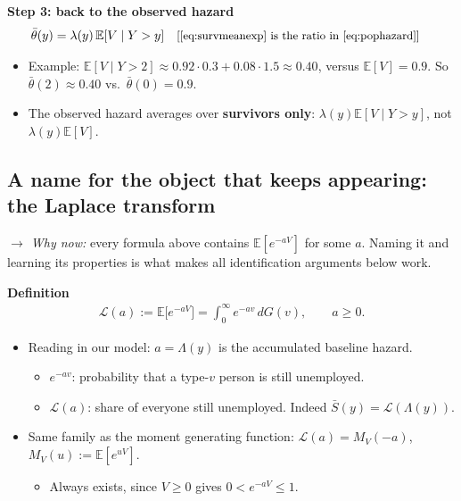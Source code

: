 \documentclass[11pt]{article}
\newcommand{\E}{\mathbb{E}}
\newcommand{\1}{\mathbf{1}}
\newcommand{\Lap}{\mathcal{L}}
\newcommand{\why}[1]{\text{\small[#1]}}
\newcommand{\whynow}[1]{\par\noindent\textit{$\rightarrow$ Why now:} #1\par}
\begin{document}
\textbf{Step 3: back to the observed hazard}
\begin{align}
  \bar\theta(y) &= \lambda(y)\,\E[V\mid Y>y] && \why{\eqref{eq:survmeanexp} is the ratio in \eqref{eq:pophazard}} \label{eq:dynsel}
\end{align}
\begin{itemize}
  \item Example: $\E[V\mid Y>2]\approx0.92\cdot0.3+0.08\cdot1.5\approx0.40$, versus $\E[V]=0.9$. So $\bar\theta(2)\approx0.40$ vs.\ $\bar\theta(0)=0.9$.
  \item The observed hazard averages over \textbf{survivors only}: $\lambda(y)\E[V\mid Y>y]$, not $\lambda(y)\E[V]$.
\end{itemize}

\subsection{A name for the object that keeps appearing: the Laplace transform}
\whynow{every formula above contains $\E[e^{-aV}]$ for some $a$. Naming it and learning its properties is what makes all identification arguments below work.}

\textbf{Definition}
\begin{align}
  \Lap(a) := \E\big[e^{-aV}\big] = \int_0^\infty e^{-av}\,dG(v), \qquad a\ge0. \label{eq:laplace}
\end{align}
\begin{itemize}
  \item Reading in our model: $a=\Lambda(y)$ is the accumulated baseline hazard.
    \begin{itemize}
      \item $e^{-av}$: probability that a type-$v$ person is still unemployed.
      \item $\Lap(a)$: share of everyone still unemployed. Indeed $\bar S(y)=\Lap(\Lambda(y))$.
    \end{itemize}
  \item Same family as the moment generating function: $\Lap(a)=M_V(-a)$, $M_V(u):=\E[e^{uV}]$.
    \begin{itemize}
      \item Always exists, since $V\ge0$ gives $0<e^{-aV}\le1$.
    \end{itemize}
\end{itemize}
\end{document}
